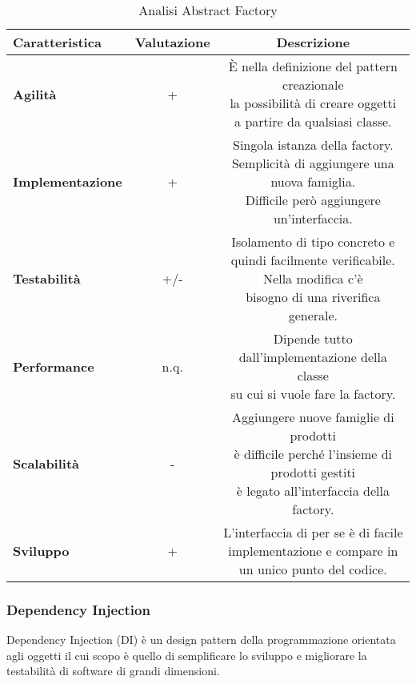 {{{\begin{itemize}
				\small %
				{\renewcommand\arraystretch{1.2} %
					\begin{center} \begin{table} \begin{tabular}{|l|c|c|}
						\hline
						{\textbf{Caratteristica}}&{\textbf{Valutazione}}&{\textbf{Descrizione}}\\
						\hline
						\textbf{Agilità} & + &  \minitab[c]{È nella definizione del pattern creazionale\\la possibilità di creare oggetti\\a partire da qualsiasi classe.} \\
						\hline
						\textbf{Implementazione} & + &  \minitab[c]{Singola istanza della factory.\\Semplicità di aggiungere una nuova famiglia.\\Difficile però aggiungere un'interfaccia.} \\
						\hline
						\textbf{Testabilità} & +/- &  \minitab[c]{Isolamento di tipo concreto e quindi facilmente verificabile.\\ Nella modifica c'è\\bisogno di una riverifica generale.} \\
						\hline
						\textbf{Performance} & n.q. &  \minitab[c]{Dipende tutto dall'implementazione della classe\\su cui si vuole fare la factory.} \\
						\hline
						\textbf{Scalabilità} & - &  \minitab[c]{Aggiungere nuove famiglie di prodotti\\è difficile perché l’insieme di prodotti gestiti\\è legato all'interfaccia della factory.}\\
						\hline
						\textbf{Sviluppo} & + &  \minitab[c]{L'interfaccia di per se è di facile\\implementazione e compare in un unico punto del codice.} \\
						\hline
					\end{tabular}
				\caption{Analisi Abstract Factory}
				\label{AAF}
			\end{table}
			 \end{center}
				}
			\end{itemize}
		}
	
		\subsubsection{Dependency Injection}{
			Dependency Injection (DI) è un design pattern della programmazione orientata agli oggetti il cui scopo è quello di semplificare lo sviluppo e migliorare la testabilità di software di grandi dimensioni.
			
}}}
